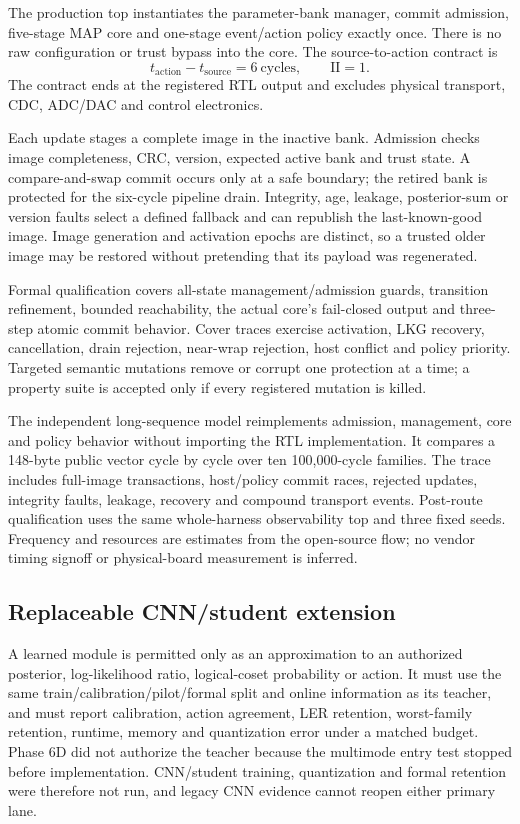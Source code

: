\documentclass[11pt]{article}
\begin{document}
The production top instantiates the parameter-bank manager, commit admission,
five-stage MAP core and one-stage event/action policy exactly once.  There is
no raw configuration or trust bypass into the core.  The source-to-action
contract is
\begin{equation}
  t_{\mathrm{action}}-t_{\mathrm{source}}=6\ \text{cycles},
  \qquad \mathrm{II}=1.
\end{equation}
The contract ends at the registered RTL output and excludes physical transport,
CDC, ADC/DAC and control electronics.

Each update stages a complete image in the inactive bank.  Admission checks
image completeness, CRC, version, expected active bank and trust state.  A
compare-and-swap commit occurs only at a safe boundary; the retired bank is
protected for the six-cycle pipeline drain.  Integrity, age, leakage,
posterior-sum or version faults select a defined fallback and can republish the
last-known-good image.  Image generation and activation epochs are distinct,
so a trusted older image may be restored without pretending that its payload
was regenerated.

Formal qualification covers all-state management/admission guards, transition
refinement, bounded reachability, the actual core's fail-closed output and
three-step atomic commit behavior.  Cover traces exercise activation, LKG
recovery, cancellation, drain rejection, near-wrap rejection, host conflict and
policy priority.  Targeted semantic mutations remove or corrupt one protection
at a time; a property suite is accepted only if every registered mutation is
killed.

The independent long-sequence model reimplements admission, management, core
and policy behavior without importing the RTL implementation.  It compares a
148-byte public vector cycle by cycle over ten 100,000-cycle families.  The
trace includes full-image transactions, host/policy commit races, rejected
updates, integrity faults, leakage, recovery and compound transport events.
Post-route qualification uses the same whole-harness observability top and
three fixed seeds.  Frequency and resources are estimates from the open-source
flow; no vendor timing signoff or physical-board measurement is inferred.

\subsection{Replaceable CNN/student extension}

A learned module is permitted only as an approximation to an authorized
posterior, log-likelihood ratio, logical-coset probability or action.  It must
use the same train/calibration/pilot/formal split and online information as its
teacher, and must report calibration, action agreement, LER retention,
worst-family retention, runtime, memory and quantization error under a matched
budget.  Phase 6D did not authorize the teacher because the multimode entry
test stopped before implementation.  CNN/student training, quantization and
formal retention were therefore not run, and legacy CNN evidence cannot reopen
either primary lane.
\end{document}
